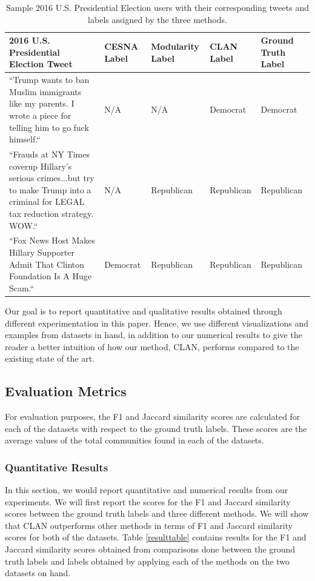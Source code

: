 \begin{table}[!b]
\centering
\begin{tabular}{ |p{6.5cm}||p{2.5cm}|p{2.5cm}|p{2.5cm}|p{2.5cm}|  }
 \hline
 2016 U.S. Presidential Election Tweet & CESNA Label & Modularity Label & CLAN Label&Ground Truth Label\\
 \hline
``Trump wants to ban Muslim immigrants like my parents. I wrote a piece for telling him to go fuck himself.``&N/A &N/A &Democrat &Democrat\\[0.5pt]
 \hline
 ``Frauds at NY Times coverup Hillary's serious crimes...but try to make Trump into a criminal for LEGAL tax reduction strategy. WOW.``&N/A&Republican&Republican&Republican\\[0.5pt]
 \hline
 ``Fox News Host Makes Hillary Supporter Admit That Clinton Foundation Is A Huge Scam.``&Democrat&Republican&Republican&Republican\\[0.5pt]
  \hline
\end{tabular}
\caption{Sample 2016 U.S. Presidential Election users with their corresponding tweets and labels assigned by the three methods.}
\label{electionexample}
\end{table}
Our goal is to report quantitative and qualitative results obtained through different experimentation in this paper. Hence, we use different visualizations and examples from datasets in hand, in addition to our numerical results to give the reader a better intuition of how our method, CLAN, performs compared to the existing state of the art. %
\subsection{Evaluation Metrics}
For evaluation purposes, the F1 and Jaccard similarity scores are calculated for each of the datasets with respect to the ground truth labels. These scores are the average values of the total communities found in each of the datasets. 

\subsubsection{Quantitative Results} In this section, we would report quantitative and numerical results from our experiments. We will first report the scores for the F1 and Jaccard similarity scores between the ground truth labels and three different methods. We will show that CLAN outperforms other methods in terms of F1 and Jaccard similarity scores for both of the datasets. %
Table \ref{resulttable} contains results for the F1 and Jaccard similarity scores obtained from comparisons done between the ground truth labels and labels obtained by applying each of the methods on the two datasets on hand.

